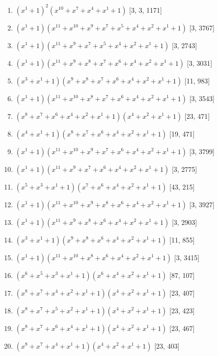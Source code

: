 \documentclass[10pt,twocolumn]{article}
\begin{document}
\begin{enumerate}
\item $(x^{1} + 1)^{2}(x^{10} + x^{7} + x^{4} + x^{1} + 1)$  [3, 3, 1171]
\item $(x^{1} + 1)(x^{11} + x^{10} + x^{9} + x^{7} + x^{5} + x^{4} + x^{2} + x^{1} + 1)$  [3, 3767]
\item $(x^{1} + 1)(x^{11} + x^{9} + x^{7} + x^{5} + x^{4} + x^{2} + x^{1} + 1)$  [3, 2743]
\item $(x^{1} + 1)(x^{11} + x^{9} + x^{8} + x^{7} + x^{6} + x^{4} + x^{2} + x^{1} + 1)$  [3, 3031]
\item $(x^{3} + x^{1} + 1)(x^{9} + x^{8} + x^{7} + x^{6} + x^{4} + x^{2} + x^{1} + 1)$  [11, 983]
\item $(x^{1} + 1)(x^{11} + x^{10} + x^{8} + x^{7} + x^{6} + x^{4} + x^{2} + x^{1} + 1)$  [3, 3543]
\item $(x^{8} + x^{7} + x^{6} + x^{4} + x^{2} + x^{1} + 1)(x^{4} + x^{2} + x^{1} + 1)$  [23, 471]
\item $(x^{4} + x^{1} + 1)(x^{8} + x^{7} + x^{6} + x^{4} + x^{2} + x^{1} + 1)$  [19, 471]
\item $(x^{1} + 1)(x^{11} + x^{10} + x^{9} + x^{7} + x^{6} + x^{4} + x^{2} + x^{1} + 1)$  [3, 3799]
\item $(x^{1} + 1)(x^{11} + x^{9} + x^{7} + x^{6} + x^{4} + x^{2} + x^{1} + 1)$  [3, 2775]
\item $(x^{5} + x^{3} + x^{1} + 1)(x^{7} + x^{6} + x^{4} + x^{2} + x^{1} + 1)$  [43, 215]
\item $(x^{1} + 1)(x^{11} + x^{10} + x^{9} + x^{8} + x^{6} + x^{4} + x^{2} + x^{1} + 1)$  [3, 3927]
\item $(x^{1} + 1)(x^{11} + x^{9} + x^{8} + x^{6} + x^{4} + x^{2} + x^{1} + 1)$  [3, 2903]
\item $(x^{3} + x^{1} + 1)(x^{9} + x^{8} + x^{6} + x^{4} + x^{2} + x^{1} + 1)$  [11, 855]
\item $(x^{1} + 1)(x^{11} + x^{10} + x^{8} + x^{6} + x^{4} + x^{2} + x^{1} + 1)$  [3, 3415]
\item $(x^{6} + x^{5} + x^{3} + x^{1} + 1)(x^{6} + x^{4} + x^{2} + x^{1} + 1)$  [87, 107]
\item $(x^{8} + x^{7} + x^{4} + x^{2} + x^{1} + 1)(x^{4} + x^{2} + x^{1} + 1)$  [23, 407]
\item $(x^{8} + x^{7} + x^{5} + x^{2} + x^{1} + 1)(x^{4} + x^{2} + x^{1} + 1)$  [23, 423]
\item $(x^{8} + x^{7} + x^{6} + x^{4} + x^{1} + 1)(x^{4} + x^{2} + x^{1} + 1)$  [23, 467]
\item $(x^{8} + x^{7} + x^{4} + x^{1} + 1)(x^{4} + x^{2} + x^{1} + 1)$  [23, 403]

\end{enumerate}
\end{document}
